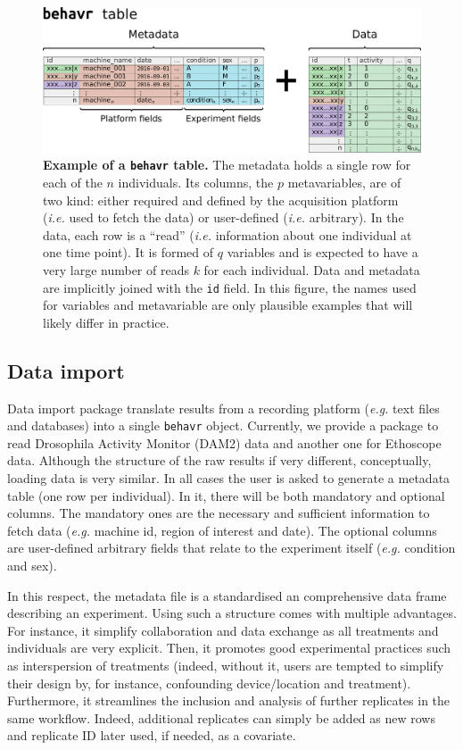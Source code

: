 \documentclass[10pt,letterpaper]{article}\usepackage[]{graphicx}\usepackage[]{color}
\begin{document}
     
\begin{figure}[!h]
	\includegraphics[width=1\textwidth]{fig/fig-2.pdf}
	\caption{{\bf Example of a \texttt{behavr} table.}
		The metadata holds a single row for each of the $n$ individuals. 
		Its columns, the $p$ metavariables, are of two kind: either required and defined by the acquisition platform (\emph{i.e.} used to fetch the data) or user-defined (\emph{i.e.} arbitrary).
		In the data, each row is a ``read'' (\emph{i.e.} information about one individual at one time point).
		It is formed of $q$ variables and is expected to have a very large number of reads $k$ for each individual.
		Data and metadata are implicitly joined with the \texttt{id} field.
		In this figure, the names used for variables and metavariable are only plausible examples that will likely differ in practice. 
	}
	\label{fig:fig-2}
\end{figure}


\subsection*{Data import}
Data import package translate results from a recording platform (\emph{e.g.} text files and databases) into a single \texttt{behavr} object.
Currently, we provide a package to read Drosophila Activity Monitor (DAM2) data  and another one for Ethoscope data.
Although the structure of the raw results if very different, conceptually, loading data is very similar.
In all cases the user is asked to generate a metadata table (one row per individual). 
In it, there will be both mandatory and optional columns.
The mandatory ones are the necessary and sufficient information to fetch data (\emph{e.g.} machine id, region of interest and date). 
The optional columns are user-defined arbitrary fields that relate to the experiment itself (\emph{e.g.} condition and sex).

In this respect, the metadata file is a standardised an comprehensive data frame describing an experiment.
Using such a structure comes with multiple advantages.
For instance, it simplify collaboration and data exchange as all treatments and individuals are very explicit.
Then, it promotes good experimental practices such as interspersion of treatments (indeed, without it, users are tempted to simplify their design by, for instance, confounding device/location and treatment).
Furthermore, it streamlines the inclusion and analysis of further replicates in the same workflow. Indeed, additional replicates can simply be added as new rows and replicate ID later used, if needed, as a covariate.	
\end{document}
